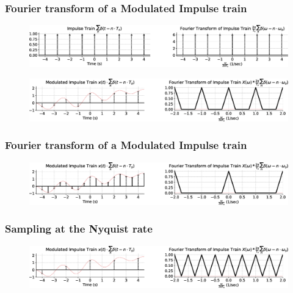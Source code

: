 \documentclass[aspectratio=169]{beamer}
\begin{document}
\begin{frame}[t]
  \frametitle{Fourier transform of a Modulated Impulse train}
  \begin{figure}
  \centering
  \includegraphics[width=1\textwidth, left]{img/impulsetrain.eps}
  \end{figure}

  \begin{figure}
  \centering
  \includegraphics[width=1\textwidth, left]{img/sampling1.eps}
  \end{figure}
\end{frame}

\begin{frame}[t]
  \frametitle{Fourier transform of a Modulated Impulse train}
  \begin{figure}
  \centering
  \includegraphics[width=1\textwidth, left]{img/sampling2.eps}
  \end{figure}
\end{frame}


\begin{frame}[t]
  \frametitle{Sampling at the Nyquist rate}
  \begin{figure}
  \centering
  \includegraphics[width=1\textwidth, left]{img/sampling4.eps}
  \end{figure}
\end{frame}
\end{document}
